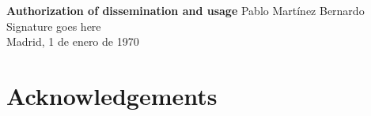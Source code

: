 
\newpage
\thispagestyle{empty}
\begin{center}
  \textbf{\Huge Authorization of dissemination and usage}
  \vfill
  {\Large Pablo Martínez Bernardo\\}
  \vspace*{1cm}
  {\Huge Signature goes here\\}
  \vspace*{1cm}
  {\Large Madrid, 1 de enero de 1970}
  \vfill
\end{center}

\newpage
\thispagestyle{empty}
\section*{Acknowledgements}

\newpage
\tableofcontents
\let\clearpage\relax
\newpage
\setcounter{page}{5}
\listoffigures
\listoftables
\newpage
